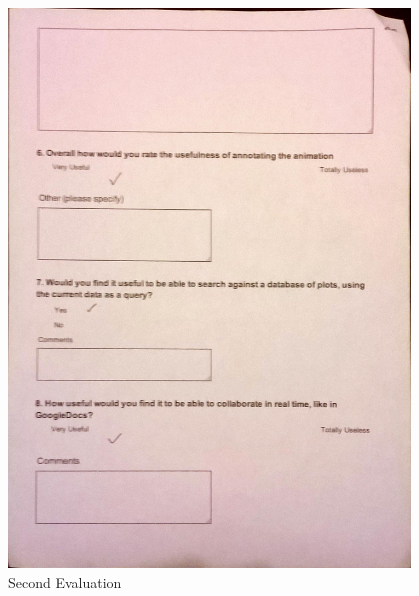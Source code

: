 \begin{figure}[h!]
    \centering
    \includegraphics[width=0.95\textwidth]{images/user_eval/user_eval_13.jpg}
    \caption{Second Evaluation}
\end{figure}

